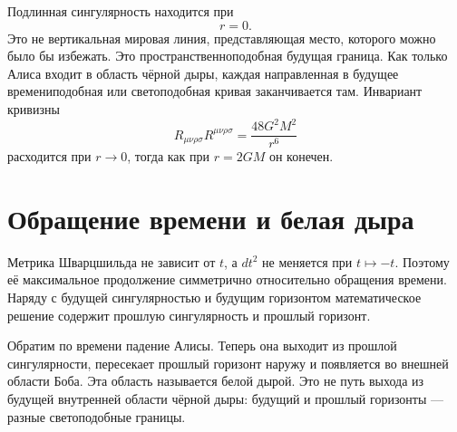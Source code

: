 Подлинная сингулярность находится при
\begin{equation}
r=0.
\end{equation}
Это не вертикальная мировая линия, представляющая место, которого можно было бы избежать. Это пространственноподобная будущая граница. Как только Алиса входит в область чёрной дыры, каждая направленная в будущее времениподобная или светоподобная кривая заканчивается там. Инвариант кривизны
\begin{equation}
R_{\mu\nu\rho\sigma}R^{\mu\nu\rho\sigma}
=\frac{48G^2M^2}{r^6}
\label{eq:l04-kretschmann}
\end{equation}
расходится при \(r\to0\), тогда как при \(r=2GM\) он конечен.

\section{Обращение времени и белая дыра}

Метрика Шварцшильда не зависит от \(t\), а \(dt^2\) не меняется при \(t\mapsto-t\). Поэтому её максимальное продолжение симметрично относительно обращения времени. Наряду с будущей сингулярностью и будущим горизонтом математическое решение содержит прошлую сингулярность и прошлый горизонт.

Обратим по времени падение Алисы. Теперь она выходит из прошлой сингулярности, пересекает прошлый горизонт наружу и появляется во внешней области Боба. Эта область называется белой дырой. Это не путь выхода из будущей внутренней области чёрной дыры: будущий и прошлый горизонты — разные светоподобные границы.

\begin{classroomqa}
\end{classroomqa}

\begin{classroomqa}
\end{classroomqa}

